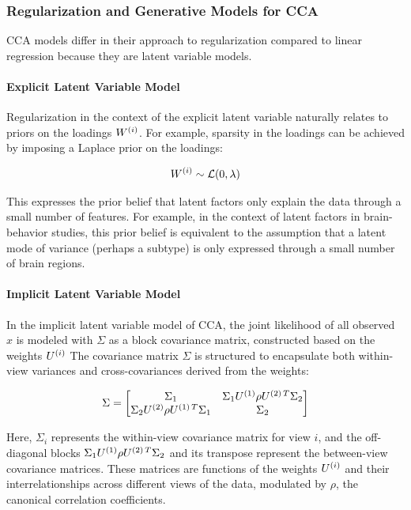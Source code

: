 \subsubsection{Regularization and Generative Models for CCA}
CCA models differ in their approach to regularization compared to linear regression because they are latent variable models.

\paragraph{Explicit Latent Variable Model}
Regularization in the context of the explicit latent variable naturally relates to priors on the loadings \(W^{(i)}\).
For example, sparsity in the loadings can be achieved by imposing a Laplace prior on the loadings:

\begin{align}
    W^{(i)} \sim \mathcal{L}(0, \lambda)
\end{align}

This expresses the prior belief that latent factors only explain the data through a small number of features.
For example, in the context of latent factors in brain-behavior studies, this prior belief is equivalent to the assumption that a latent mode of variance (perhaps a subtype) is only expressed through a small number of brain regions.

\paragraph{Implicit Latent Variable Model}
In the implicit latent variable model of CCA, the joint likelihood of all observed \(x\) is modeled with \(\Sigma\) as a block covariance matrix, constructed based on the weights \(U^{(i)}\)
The covariance matrix \(\Sigma\) is structured to encapsulate both within-view variances and cross-covariances derived from the weights:

\begin{equation}
    \Sigma = \begin{bmatrix}
                 \Sigma_{1} & \Sigma_{1} U^{(1)} \rho U^{(2)\,T} \Sigma_{2} \\
                 \Sigma_{2} U^{(2)} \rho U^{(1)\,T} \Sigma_{1} & \Sigma_{2}
    \end{bmatrix}
\end{equation}

Here, \(\Sigma_{i}\) represents the within-view covariance matrix for view \(i\), and the off-diagonal blocks \(\Sigma_{1} U^{(1)} \rho U^{(2)\,T} \Sigma_{2}\) and its transpose represent the between-view covariance matrices.
These matrices are functions of the weights \(U^{(i)}\) and their interrelationships across different views of the data, modulated by \(\rho\), the canonical correlation coefficients.

